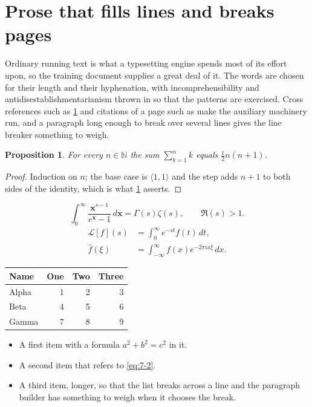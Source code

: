 \documentclass[11pt,a4paper]{report}
\theoremstyle{plain}
\newtheorem{proposition}{Proposition}[chapter]
\newcommand{\vecn}[1]{\mathbf{#1}}
\newcommand{\pairs}[2]{\langle #1,#2\rangle}
\begin{document}
\section{Prose that fills lines and breaks pages}
\label{sec:prose7-2}
Ordinary running text is what a typesetting engine spends most of its effort
upon, so the training document supplies a great deal of it. The words are
chosen for their length and their hyphenation, with incomprehensibility and
antidisestablishmentarianism thrown in so that the patterns are exercised.
Cross references such as \cref{sec:prose7-2} and citations of a page such
as \pageref{sec:prose7-2} make the auxiliary machinery run, and a
paragraph long enough to break over several lines gives the line breaker
something to weigh.
\begin{proposition}\label{prop:7-2}
For every $n\in\mathbb{N}$ the sum $\sum_{k=1}^{n}k$ equals
$\tfrac{1}{2}n(n+1)$.
\end{proposition}
\begin{proof}
Induction on $n$; the base case is $\pairs{1}{1}$ and the step adds $n+1$ to
both sides of the identity, which is what \cref{prop:7-2} asserts.
\end{proof}
\begin{equation}\label{eq:7-2}
  \int_{0}^{\infty}\frac{\vecn{x}^{s-1}}{e^{\vecn{x}}-1}\,d\vecn{x}
    = \Gamma(s)\zeta(s),\qquad \Re(s)>1 .
\end{equation}
\begin{align}
  \mathcal{L}[f](s) &= \int_{0}^{\infty} e^{-st} f(t)\,dt, \\
  \widehat{f}(\xi)  &= \int_{-\infty}^{\infty} f(x) e^{-2\pi i x\xi}\,dx .
\end{align}
\par\noindent\begin{center}
\begin{tabular}{lrrr}
\hline
Name & One & Two & Three \\
\hline
Alpha & 1 & 2 & 3 \\
Beta & 4 & 5 & 6 \\
Gamma & 7 & 8 & 9 \\
\hline
\end{tabular}
\end{center}
\begin{itemize}
  \item A first item with a formula $a^2+b^2=c^2$ in it.
  \item A second item that refers to \eqref{eq:7-2}.
  \item A third item, longer, so that the list breaks across a line and the
    paragraph builder has something to weigh when it chooses the break.
\end{itemize}
\end{document}
